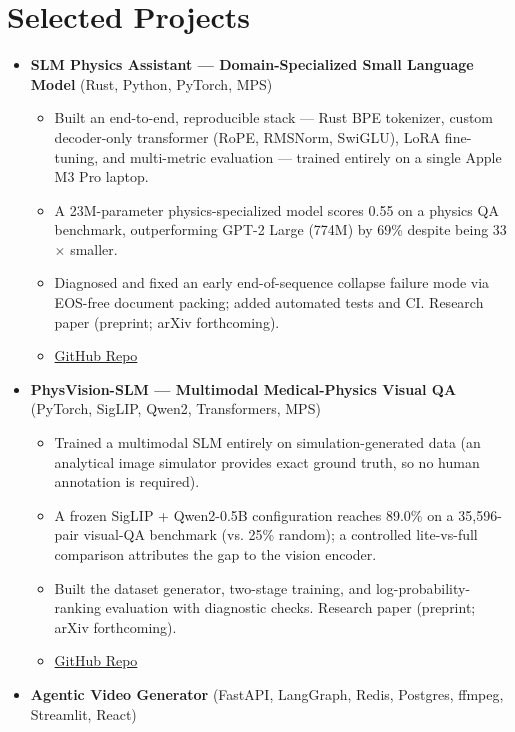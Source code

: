 \documentclass[a4paper,10pt]{article}
\begin{document}
\section{Selected Projects}
\begin{itemize}[leftmargin=0.5cm]
  \item \textbf{SLM Physics Assistant --- Domain-Specialized Small Language Model} (Rust, Python, PyTorch, MPS)
  \begin{itemize}[leftmargin=0.45cm]
    \item Built an end-to-end, reproducible stack --- Rust BPE tokenizer, custom decoder-only transformer (RoPE, RMSNorm, SwiGLU), LoRA fine-tuning, and multi-metric evaluation --- trained entirely on a single Apple M3 Pro laptop.
    \item A 23M-parameter physics-specialized model scores 0.55 on a physics QA benchmark, outperforming GPT-2 Large (774M) by 69\% despite being 33$\times$ smaller.
    \item Diagnosed and fixed an early end-of-sequence collapse failure mode via EOS-free document packing; added automated tests and CI. Research paper (preprint; arXiv forthcoming).
    \item \href{https://github.com/JaydipSingh/slm-physics-assistant}{GitHub Repo}
  \end{itemize}
  \item \textbf{PhysVision-SLM --- Multimodal Medical-Physics Visual QA} (PyTorch, SigLIP, Qwen2, Transformers, MPS)
  \begin{itemize}[leftmargin=0.45cm]
    \item Trained a multimodal SLM entirely on simulation-generated data (an analytical image simulator provides exact ground truth, so no human annotation is required).
    \item A frozen SigLIP + Qwen2-0.5B configuration reaches 89.0\% on a 35,596-pair visual-QA benchmark (vs. 25\% random); a controlled lite-vs-full comparison attributes the gap to the vision encoder.
    \item Built the dataset generator, two-stage training, and log-probability-ranking evaluation with diagnostic checks. Research paper (preprint; arXiv forthcoming).
    \item \href{https://github.com/JaydipSingh/physvision-slm}{GitHub Repo}
  \end{itemize}
  \item \textbf{Agentic Video Generator} (FastAPI, LangGraph, Redis, Postgres, ffmpeg, Streamlit, React)
  \begin{itemize}[leftmargin=0.45cm]

\end{itemize}
\end{itemize}
\end{document}
